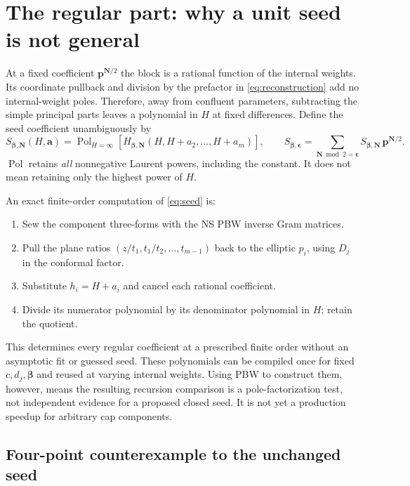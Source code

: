 \documentclass[11pt]{article}
\newcommand{\eps}{\boldsymbol\epsilon}
\newcommand{\bet}{\boldsymbol\beta}
\newcommand{\pp}{\boldsymbol p}
\newcommand{\Pol}{\operatorname{Pol}}
\begin{document}
\section{The regular part: why a unit seed is not general}

At a fixed coefficient $\pp^{\boldsymbol N/2}$ the block is a rational
function of the internal weights.  Its coordinate pullback and division
by the prefactor in \eqref{eq:reconstruction} add no internal-weight
poles.  Therefore, away from confluent parameters, subtracting the
simple principal parts leaves a polynomial in $H$ at fixed differences.
Define the seed coefficient unambiguously by
\begin{equation}\label{eq:seed}
 S_{\bet,\boldsymbol N}(H,\boldsymbol a)=
 \Pol_{H=\infty}
 \left[H_{\bet,\boldsymbol N}(H,H+a_2,\ldots,H+a_m)\right],
 \qquad
 S_{\bet,\eps}=\sum_{\boldsymbol N\bmod2=\eps}
       S_{\bet,\boldsymbol N}\,\pp^{\boldsymbol N/2}.
\end{equation}
$\Pol$ retains \emph{all} nonnegative Laurent powers, including the
constant.  It does not mean retaining only the highest power of $H$.

An exact finite-order computation of \eqref{eq:seed} is:
\begin{enumerate}
 \item Sew the component three-forms with the NS PBW inverse Gram matrices.
 \item Pull the plane ratios $(z/t_1,t_1/t_2,\ldots,t_{m-1})$ back to the
 elliptic $p_i$, using $D_j$ in the conformal factor.
 \item Substitute $h_i=H+a_i$ and cancel each rational coefficient.
 \item Divide its numerator polynomial by its denominator polynomial in
 $H$; retain the quotient.
\end{enumerate}
This determines every regular coefficient at a prescribed finite order
without an asymptotic fit or guessed seed.  These polynomials can be
compiled once for fixed $c,d_j,\bet$ and reused at varying internal
weights.  Using PBW to construct them, however, means the resulting
recursion comparison is a pole-factorization test, not independent
evidence for a proposed closed seed.  It is not yet a production speedup
for arbitrary cap components.

\subsection{Four-point counterexample to the unchanged seed}
\end{document}
